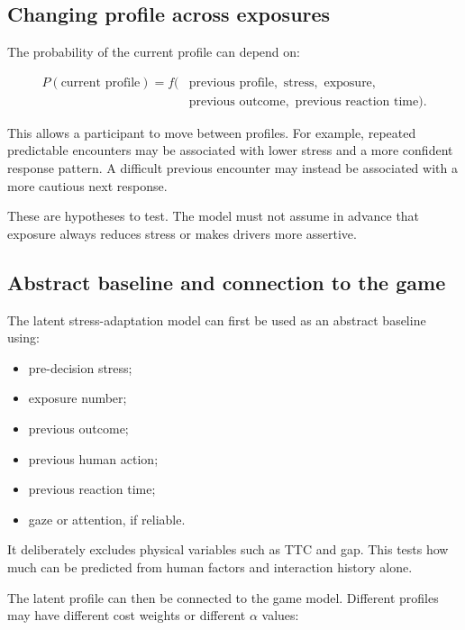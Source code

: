 \documentclass[11pt,a4paper]{article}
\begin{document}
\subsection{Changing profile across exposures}

The probability of the current profile can depend on:

\begin{equation}
\begin{aligned}
P(\text{current profile})=f(&\text{previous profile},\text{ stress},\text{ exposure},\\
                            &\text{previous outcome},\text{ previous reaction time}).
\end{aligned}
\end{equation}

This allows a participant to move between profiles. For example, repeated predictable encounters may be associated with lower stress and a more confident response pattern. A difficult previous encounter may instead be associated with a more cautious next response.

These are hypotheses to test. The model must not assume in advance that exposure always reduces stress or makes drivers more assertive.

\subsection{Abstract baseline and connection to the game}

The latent stress-adaptation model can first be used as an abstract baseline using:

\begin{itemize}[noitemsep]
  \item pre-decision stress;
  \item exposure number;
  \item previous outcome;
  \item previous human action;
  \item previous reaction time;
  \item gaze or attention, if reliable.
\end{itemize}

It deliberately excludes physical variables such as TTC and gap. This tests how much can be predicted from human factors and interaction history alone.

The latent profile can then be connected to the game model. Different profiles may have different cost weights or different $\alpha$ values:
\end{document}
